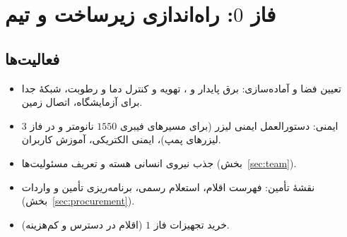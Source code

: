 \section{فاز $0$: راه‌اندازی زیرساخت و تیم}
\label{sec:phase0}
\subsection{فعالیت‌ها}
\begin{itemize}[leftmargin=*,itemsep=2pt]
\item تعیین فضا و آماده‌سازی: برق پایدار و ، تهویه و کنترل دما و رطوبت، شبکهٔ جدا برای آزمایشگاه، اتصال زمین.
\item ایمنی: دستورالعمل ایمنی لیزر (برای مسیرهای فیبری $1550$ نانومتر و در فاز $3$ لیزرهای پمپ)، ایمنی الکتریکی، آموزش کاربران.
\item جذب نیروی انسانی هسته و تعریف مسئولیت‌ها (بخش~\ref{sec:team}).
\item نقشهٔ تأمین: فهرست اقلام، استعلام رسمی، برنامه‌ریزی تأمین و واردات (بخش~\ref{sec:procurement}).
\item خرید تجهیزات فاز $1$ (اقلام در دسترس و کم‌هزینه).
\end{itemize}

